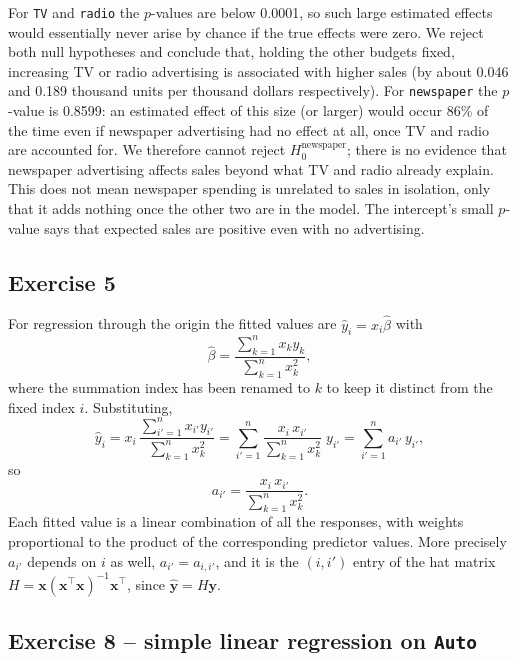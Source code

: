 \documentclass[11pt]{article}
\begin{document}
For \texttt{TV} and \texttt{radio} the $p$-values are below 0.0001, so such large estimated effects would essentially never arise by chance if the true effects were zero. We reject both null hypotheses and conclude that, holding the other budgets fixed, increasing TV or radio advertising is associated with higher sales (by about 0.046 and 0.189 thousand units per thousand dollars respectively). For \texttt{newspaper} the $p$-value is 0.8599: an estimated effect of this size (or larger) would occur 86\% of the time even if newspaper advertising had no effect at all, once TV and radio are accounted for. We therefore cannot reject $H_0^{\text{newspaper}}$; there is no evidence that newspaper advertising affects sales beyond what TV and radio already explain. This does not mean newspaper spending is unrelated to sales in isolation, only that it adds nothing once the other two are in the model. The intercept's small $p$-value says that expected sales are positive even with no advertising.

\subsection*{Exercise 5}

For regression through the origin the fitted values are $\hat y_i = x_i \hat\beta$ with
\begin{equation*}
  \hat\beta = \frac{\sum_{k=1}^n x_k y_k}{\sum_{k=1}^n x_k^2},
\end{equation*}
where the summation index has been renamed to $k$ to keep it distinct from the fixed index $i$. Substituting,
\begin{equation*}
  \hat y_i = x_i\,\frac{\sum_{i'=1}^n x_{i'} y_{i'}}{\sum_{k=1}^n x_k^2}
          = \sum_{i'=1}^n \frac{x_i\, x_{i'}}{\sum_{k=1}^n x_k^2}\; y_{i'}
          = \sum_{i'=1}^n a_{i'}\, y_{i'},
\end{equation*}
so
\begin{equation*}
  a_{i'} = \frac{x_i\, x_{i'}}{\sum_{k=1}^n x_k^2}.
\end{equation*}
Each fitted value is a linear combination of all the responses, with weights proportional to the product of the corresponding predictor values. More precisely $a_{i'}$ depends on $i$ as well, $a_{i'} = a_{i,i'}$, and it is the $(i,i')$ entry of the hat matrix $H = \mathbf{x}(\mathbf{x}^\top\mathbf{x})^{-1}\mathbf{x}^\top$, since $\hat{\mathbf y} = H\mathbf y$.

\subsection*{Exercise 8 -- simple linear regression on \texttt{Auto}}
\end{document}
